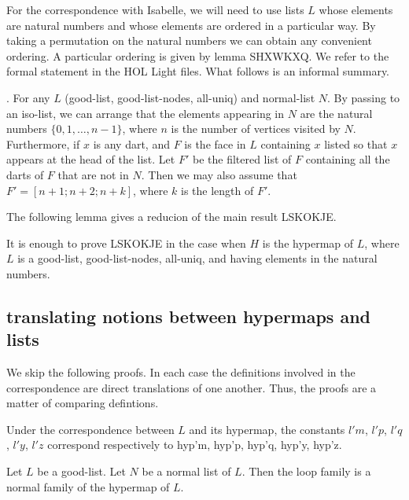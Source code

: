 For the correspondence with Isabelle, we will need to use lists $L$ whose elements are natural numbers and
whose elements are ordered in a particular way.  By taking a permutation on the natural numbers we can obtain
any convenient ordering.  A particular ordering is given by lemma SHXWKXQ.  We refer to the formal statement
in the HOL Light files.  What follows is an informal summary.

\begin{lemma}.  For any $L$ (good-list, good-list-nodes, all-uniq)
and normal-list $N$.  By passing to an iso-list, we can arrange that the elements appearing
in $N$ are the natural numbers $\{0,1,\ldots,n-1\}$, where $n$ is the number of vertices visited by $N$.
Furthermore, if $x$ is any dart, and $F$ is the face in $L$ containing $x$ listed so that $x$ appears at the head of the
list.  Let $F'$ be the filtered list of $F$ containing all the darts of $F$ that are not in $N$.  Then we may also assume that
$F' = [n+1;n+2;n+k]$, where $k$ is the length of $F'$.
\end{lemma}

The following lemma gives a reducion of the main result LSKOKJE.

\begin{lemma}[JCAJYDU]  It is enough to prove LSKOKJE in the case when $H$ is the hypermap of $L$,
where $L$ is a good-list, good-list-nodes, all-uniq, and having elements in the natural numbers.
\end{lemma}


\subsection{translating notions between hypermaps and lists}


We skip the following proofs.  In each case the definitions involved in the correspondence
are direct translations of one another.  Thus, the proofs are a matter of comparing defintions.

\begin{lemma} Under the correspondence between $L$ and its hypermap, the constants
$l'm$, $l'p$, $l'q$, $l'y$, $l'z$ correspond respectively to hyp'm, hyp'p, hyp'q, hyp'y, hyp'z.
\end{lemma}

\begin{lemma} Let $L$ be a good-list.  Let $N$ be a normal list of $L$.
Then the loop family is a normal family of the hypermap of $L$.  
\end{lemma}

